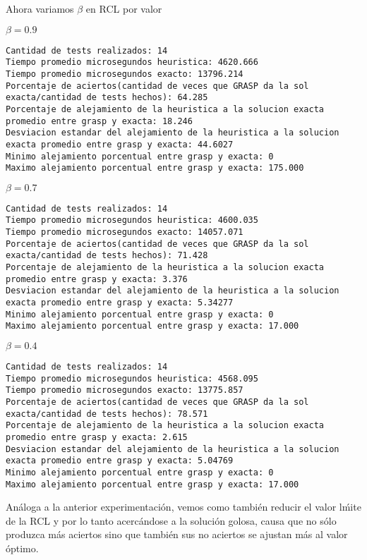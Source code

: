 Ahora variamos $\beta$ en RCL por valor

$\beta = 0.9$
\begin{lstlisting}[frame=single]
Cantidad de tests realizados: 14
Tiempo promedio microsegundos heuristica: 4620.666
Tiempo promedio microsegundos exacto: 13796.214
Porcentaje de aciertos(cantidad de veces que GRASP da la sol exacta/cantidad de tests hechos): 64.285
Porcentaje de alejamiento de la heuristica a la solucion exacta promedio entre grasp y exacta: 18.246
Desviacion estandar del alejamiento de la heuristica a la solucion exacta promedio entre grasp y exacta: 44.6027
Minimo alejamiento porcentual entre grasp y exacta: 0
Maximo alejamiento porcentual entre grasp y exacta: 175.000
\end{lstlisting}

$\beta = 0.7$
\begin{lstlisting}[frame=single]
Cantidad de tests realizados: 14
Tiempo promedio microsegundos heuristica: 4600.035
Tiempo promedio microsegundos exacto: 14057.071
Porcentaje de aciertos(cantidad de veces que GRASP da la sol exacta/cantidad de tests hechos): 71.428
Porcentaje de alejamiento de la heuristica a la solucion exacta promedio entre grasp y exacta: 3.376
Desviacion estandar del alejamiento de la heuristica a la solucion exacta promedio entre grasp y exacta: 5.34277
Minimo alejamiento porcentual entre grasp y exacta: 0
Maximo alejamiento porcentual entre grasp y exacta: 17.000
\end{lstlisting}

$\beta = 0.4$

\begin{lstlisting}[frame=single]
Cantidad de tests realizados: 14
Tiempo promedio microsegundos heuristica: 4568.095
Tiempo promedio microsegundos exacto: 13775.857
Porcentaje de aciertos(cantidad de veces que GRASP da la sol exacta/cantidad de tests hechos): 78.571
Porcentaje de alejamiento de la heuristica a la solucion exacta promedio entre grasp y exacta: 2.615
Desviacion estandar del alejamiento de la heuristica a la solucion exacta promedio entre grasp y exacta: 5.04769
Minimo alejamiento porcentual entre grasp y exacta: 0
Maximo alejamiento porcentual entre grasp y exacta: 17.000
\end{lstlisting}

An\'aloga a la anterior experimentaci\'on, vemos como tambi\'en reducir el valor l\'mite de la RCL y por lo tanto acerc\'andose a la soluci\'on golosa, causa que no s\'olo produzca m\'as aciertos sino que tambi\'en sus no aciertos se ajustan m\'as al valor \'optimo.


